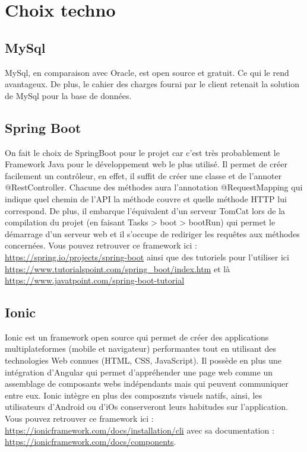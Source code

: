 	\section{Choix techno}


		\subsection{MySql}
			MySql, en comparaison avec Oracle, est open source et gratuit. Ce qui le rend avantageux. \newline
			De plus, le cahier des charges fourni par le client retenait la solution de MySql pour la base de données.

		\subsection{Spring Boot}
			On fait le choix de SpringBoot pour le projet car c'est très probablement le Framework Java pour le développement web le plus utilisé. Il permet de créer facilement un contrôleur, en effet, il suffit de créer une classe et de l’annoter @RestController. Chacune des méthodes aura l’annotation @RequestMapping qui indique quel chemin de l’API la méthode couvre et quelle méthode HTTP lui correspond.\newline
			De plus, il embarque l'équivalent d'un serveur TomCat lors de la compilation du projet (en faisant Tasks > boot > bootRun) qui permet le démarrage d'un serveur web et il s'occupe de rediriger les requêtes aux méthodes concernées. \newline
			Vous pouvez retrouver ce framework ici : \url{https://spring.io/projects/spring-boot} ainsi que des tutoriels pour l'utiliser ici \url{https://www.tutorialspoint.com/spring_boot/index.htm} et là \url{https://www.javatpoint.com/spring-boot-tutorial}

		\subsection{Ionic}
			Ionic est un framework open source qui permet de créer des applications multiplateformes (mobile et navigateur) performantes tout en utilisant des technologies Web connues (HTML, CSS, JavaScript). Il possède en plus une intégration d'Angular qui permet d'appréhender une page web comme un assemblage de composants webs indépendants mais qui peuvent communiquer entre eux. \newline
			Ionic intègre en plus des composznts visuels natifs, ainsi, les utilisateurs d'Android ou d'iOs conserveront leurs habitudes sur l'application. \newline
			Vous pouvez retrouver ce framework ici : \url{https://ionicframework.com/docs/installation/cli} avec sa documentation : \url{https://ionicframework.com/docs/components}.

